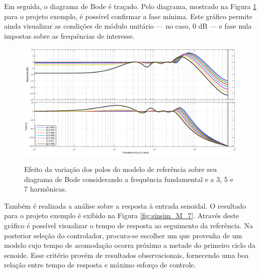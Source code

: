 \documentclass[repeatfields,oneside,overleaf]{tcc}
\begin{document}
Em seguida, o diagrama de Bode é traçado.
Pelo diagrama, mostrado na Figura \ref{fig:bode_M_7} para o projeto exemplo, é possível confirmar a fase mínima.
Este gráfico permite ainda visualizar as condições de módulo unitário --- no caso, $0 \text{ dB}$ --- e fase nula impostas sobre as frequências de interesse.

\begin{figure}[h]
    \centering
    \caption{Efeito da variação dos polos do modelo de referência sobre seu diagrama de Bode considerando a frequência fundamental e a 3{\textordfeminine}, 5{\textordfeminine} e 7{\textordfeminine} harmônicas.}
    \includegraphics[trim={80 24.5 80 43}, clip, width=0.78\linewidth]{fig/bode_M_7.eps}
    \\
    \label{fig:bode_M_7}
\end{figure}

\newpage

Também é realizada a análise sobre a resposta à entrada senoidal.
O resultado para o projeto exemplo é exibido na Figura \ref{fig:sinsim_M_7}.
Através deste gráfico é possível visualizar o tempo de resposta ao seguimento da referência.
Na posterior seleção do controlador, procura-se escolher um que provenha de um modelo cujo tempo de acomodação ocorra próximo a metade do primeiro ciclo da senoide.
Esse critério provém de resultados observacionais, fornecendo uma boa relação entre tempo de resposta e máximo esforço de controle.
\end{document}
